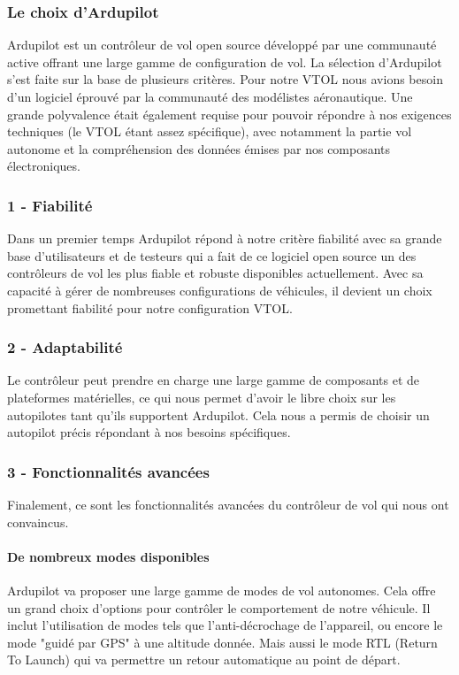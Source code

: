 \documentclass[a4paper,12pt,french]{report}
\begin{document}
\subsubsection{Le choix d'Ardupilot}

Ardupilot est un contrôleur de vol open source développé par une communauté active offrant une large gamme de configuration de vol. La sélection d’Ardupilot s’est faite sur la base de plusieurs critères. Pour notre VTOL nous avions besoin d’un logiciel éprouvé par la communauté des modélistes aéronautique. Une grande polyvalence était également requise pour pouvoir répondre à nos exigences techniques (le VTOL étant assez spécifique), avec notamment la partie vol autonome et la compréhension des données émises par nos composants électroniques.
\subsubsection{1 - Fiabilité}

Dans un premier temps Ardupilot répond à notre critère fiabilité avec sa grande base d’utilisateurs et de testeurs qui a fait de ce logiciel open source un des contrôleurs de vol les plus fiable et robuste disponibles actuellement.
Avec sa capacité à gérer de nombreuses configurations de véhicules, il devient un choix promettant fiabilité pour notre configuration VTOL.

\subsubsection{2 - Adaptabilité}

Le contrôleur peut prendre en charge une large gamme de composants et de plateformes matérielles, ce qui nous permet d’avoir le libre choix sur les autopilotes tant qu’ils supportent Ardupilot. Cela nous a permis de choisir un autopilot précis répondant à nos besoins spécifiques.

\subsubsection{3 - Fonctionnalités avancées}

Finalement, ce sont les fonctionnalités avancées du contrôleur de vol qui nous ont convaincus.

\paragraph{De nombreux modes disponibles} Ardupilot va proposer une large gamme de modes de vol autonomes. Cela offre un grand choix d’options pour contrôler le comportement de notre véhicule. Il inclut l’utilisation de modes tels que l'anti-décrochage de l’appareil, ou encore le mode "guidé par GPS" à une altitude donnée. Mais aussi le mode RTL (Return To Launch) qui va permettre un retour automatique au point de départ.
\end{document}
